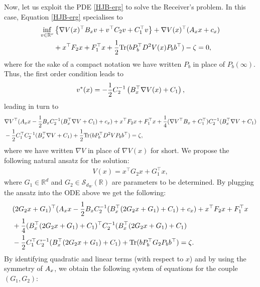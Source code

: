 \documentclass[a4paper,10pt]{article}
\newcommand{\RR}{\mathbb{R}}
\theoremstyle{definition}
\theoremstyle{plain}
\numberwithin{equation}{section}
\begin{document}
Now, let us exploit the PDE \eqref{HJB-erg} to solve the Receiver's problem. 
In this case, Equation \eqref{HJB-erg} specialises to
\begin{align}
    \inf_{v \in \mathbb R^r} & \left\{  \nabla  V(x)^\top B_{\rm x} v + v^\top C_2 v +C_1^\top v \right\} 
    + \nabla  V(x)^\top (A_{\rm x} x +c_{\rm x}) \\
 &   + x^\top F_2 x + F_1 ^\top x + \frac{1}{2}\text{Tr}(b P_b^\top D^2 V(x)P_b b^\top)  - \zeta  =0,
\end{align}
where for the sake of a compact notation we have written $P_b$ in place of $P_b(\infty)$.
Thus, the first order condition leads to
\begin{equation}
     v^*(x) = - \frac{1}{2}C_2 ^{-1} \left( B_{\rm x} ^\top \nabla V(x) + C_1\right),
\end{equation}
leading in turn to
\begin{align}
    &\nabla  V^\top (A_{\rm x} x  - \frac{1}{2}B_{\rm x} C_2 ^{-1}(B_{\rm x} ^\top \nabla V + C_1) +c_{\rm x}) + x^\top F_2 x + F_1 ^\top x 
    + \frac{1}{4} (\nabla V^\top B_{\rm x} + C_1^\top) C_2 ^{-1}(B_{\rm x} ^\top \nabla V + C_1)  \nonumber \\
    & - \frac{1}{2}C_1 ^\top C_2 ^{-1}(B_{\rm x} ^\top \nabla V + C_1) + \frac{1}{2}\text{Tr}(b P_b^\top D^2 V P_b b^\top) = \zeta,
\end{align}
where we have written $\nabla V$ in place of $\nabla V(x)$ for short. We propose the following natural ansatz for the solution:
\begin{align}
    V(x)= x^\top G_2 x + G_1 ^\top x,
\end{align}
where $G_1 \in \RR^d$ and $G_2 \in \mathcal S_{d_W}(\RR)$ are parameters to be determined.  
By plugging the ansatz into the ODE above we get the following: 
\begin{align}
    &(2G_2 x +G_1)^\top (A_{\rm x} x  - \frac{1}{2}B_{\rm x} C_2 ^{-1}(B_{\rm x} ^\top (2G_2 x + G_1) + C_1) + c_{\rm x}) + x^\top F_2 x + F_1 ^\top x \\
    &+\frac{1}{4}(B_{\rm x} ^\top (2G_2 x + G_1) + C_1)^\top C_2 ^{-1} (B_{\rm x} ^\top (2G_2 x + G_1) + C_1) \\
    & - \frac{1}{2} C_1 ^\top C_2 ^{-1} (B_{\rm x} ^\top (2 G_2 x + G_1) + C_1) + \text{Tr}(bP_b^\top G_2 P_b b^\top) = \zeta.
\end{align}
By identifying quadratic and linear terms (with respect to $x$) and by using the symmetry of $A_{\rm x}$, we obtain the following system of equations for the couple $(G_1,G_2)$:
\end{document}
